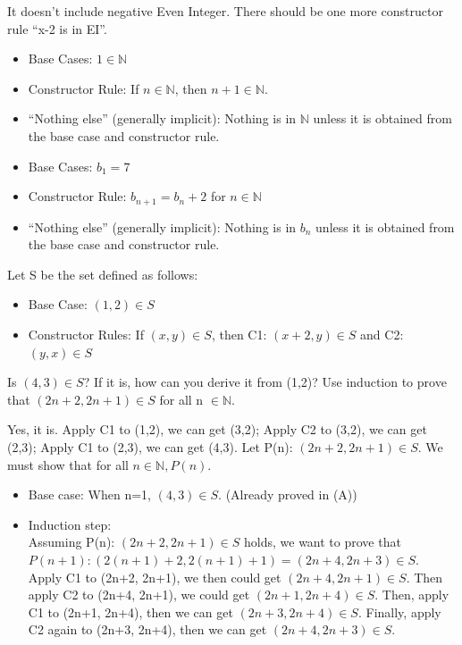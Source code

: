 \documentclass[solution, letterpaper]{cs20inclass}
\begin{document}
\begin{solution}
\subsolution  It doesn't include negative Even Integer. There should be one more constructor rule “x-2 is in EI”.
\subsolution 
\begin{itemize}
\item Base Cases:  $1\in \mathbb{N}$
\item Constructor Rule: If $n\in\mathbb{N}$, then $n+1\in\mathbb{N}$.
\item “Nothing else” (generally implicit): Nothing is in $\mathbb{N}$ unless it is obtained from the base case and constructor rule.
\end{itemize}
\subsolution
\begin{itemize}
\item Base Cases:  $b_1=7$
\item Constructor Rule: $b_{n+1}=b_n+2$ for $n\in\mathbb{N}$
\item “Nothing else” (generally implicit): Nothing is in $b_n$ unless it is obtained from the base case and constructor rule.
\end{itemize}
\end{solution}

\problem Let S be the set defined as follows:
\begin{itemize}
\item Base Case: $(1,2) \in S$
\item Constructor Rules: If $(x,y)\in S$, then C1: $(x+2, y) \in S$ and C2: $(y,x) \in S$ 
\end{itemize}
\subproblem Is $(4,3)\in S$? If it is, how can you derive it from (1,2)?
\subproblem Use induction to prove that $(2n+2, 2n+1)\in S$ for all n $\in \mathbb{N}$.

\begin{solution}
\subsolution Yes, it is. Apply C1 to (1,2), we can get (3,2); Apply C2 to (3,2), we can get (2,3); Apply C1 to (2,3), we can get (4,3).
\subsolution Let P(n): $(2n+2, 2n+1)\in S$. We must show that for all $n\in\mathbb{N}, P(n)$.
\begin{itemize}
\item Base case: When n=1, $(4,3)\in S$. (Already proved in (A))
\item Induction step: \\
Assuming P(n): $(2n+2, 2n+1)\in S$ holds, we want to prove that $P(n+1): (2(n+1)+2, 2(n+1)+1)=(2n+4, 2n+3)\in S$.\\
Apply C1 to (2n+2, 2n+1), we then could get $(2n+4, 2n+1)\in S$. Then apply C2 to (2n+4, 2n+1), we could get $(2n+1, 2n+4)\in S$. Then, apply C1 to (2n+1, 2n+4), then we can get $(2n+3, 2n+4)\in S$. Finally, apply C2 again to (2n+3, 2n+4), then we can get $(2n+4, 2n+3)\in S$.
\end{itemize}
\end{solution}
\end{document}
